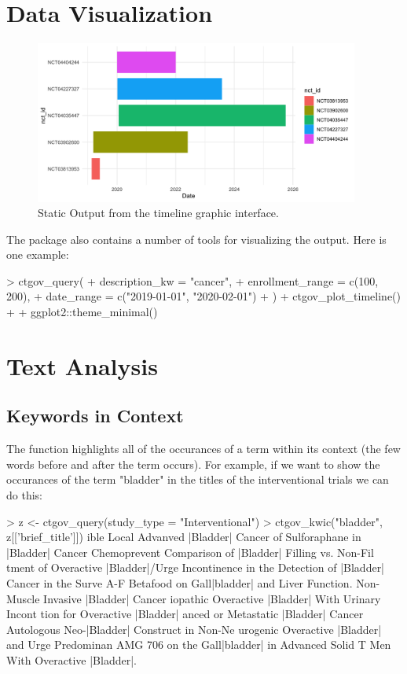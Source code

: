 \section{Data Visualization}

\begin{figure}[t!]
  \centering
  \includegraphics[width=0.95\textwidth]{fig1.png}
  \caption{Static Output from the timeline graphic interface.}
  \label{figure:timeline}
\end{figure}

The package also contains a number of tools for visualizing the output.
Here is one example:

\begin{example}
> ctgov_query(
+    description_kw = "cancer",
+    enrollment_range = c(100, 200),
+    date_range = c("2019-01-01", "2020-02-01")
+  ) %
+  ctgov_plot_timeline() +
+    ggplot2::theme_minimal()
\end{example}

\section{Text Analysis}

\subsection{Keywords in Context}

The function  highlights all of the occurances of a term within
its context (the few words before and after the term occurs). For example, if
we want to show the occurances of the term "bladder" in the titles of the
interventional trials we can do this:

\begin{example}
> z <- ctgov_query(study_type = "Interventional")
> ctgov_kwic("bladder", z[['brief_title']])
ible Local Advanved |Bladder| Cancer
 of Sulforaphane in |Bladder| Cancer Chemoprevent
      Comparison of |Bladder| Filling vs. Non-Fil
tment of Overactive |Bladder|/Urge Incontinence
in the Detection of |Bladder| Cancer in the Surve
A-F Betafood on Gall|bladder| and Liver Function.
Non-Muscle Invasive |Bladder| Cancer
iopathic Overactive |Bladder| With Urinary Incont
tion for Overactive |Bladder|
anced or Metastatic |Bladder| Cancer
     Autologous Neo-|Bladder| Construct in Non-Ne
urogenic Overactive |Bladder| and Urge Predominan
 AMG 706 on the Gall|bladder| in Advanced Solid T
Men With Overactive |Bladder|.
\end{example}

